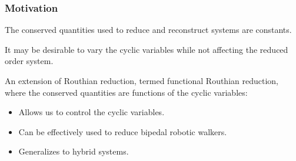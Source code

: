 \begin{frame}
  \frametitle{Motivation}
  \begin{description}[D]
  \item[ Classical Reduction:]  The conserved quantities used to reduce and reconstruct systems are constants.
  \item[ Yet:]  It may be desirable to \alert{vary} the cyclic variables while not affecting the reduced order system.
  \item[ Motivates:]  An extension of Routhian reduction, termed \alert{functional Routhian reduction}, where the conserved quantities are functions of the cyclic variables:
    \begin{itemize}
    \item Allows us to control the cyclic variables.
    \item Can be effectively used to reduce bipedal robotic walkers.
    \item Generalizes to hybrid systems.
    \end{itemize}
  \end{description}
\end{frame}


